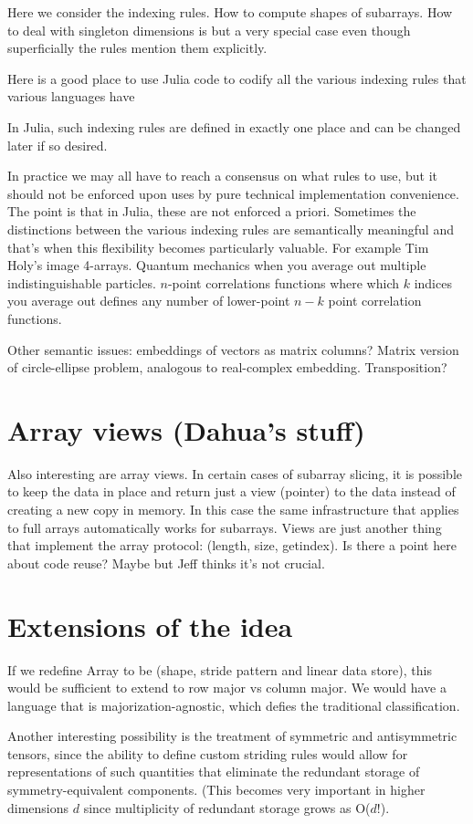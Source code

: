 \documentclass[english]{article}
\begin{document}
Here we consider the indexing rules. How to compute shapes of subarrays.
How to deal with singleton dimensions is but a very special case even
though superficially the rules mention them explicitly.

Here is a good place to use Julia code to codify all the various indexing
rules that various languages have

In Julia, such indexing rules are defined in exactly one place and
can be changed later if so desired.

In practice we may all have to reach a consensus on what rules to
use, but it should not be enforced upon uses by pure technical implementation
convenience. The point is that in Julia, these are not enforced a
priori. Sometimes the distinctions between the various indexing rules
are semantically meaningful and that's when this flexibility becomes
particularly valuable. For example Tim Holy's image 4-arrays. Quantum
mechanics when you average out multiple indistinguishable particles.
$n$-point correlations functions where which $k$ indices you average out defines
any number of lower-point $n-k$ point correlation functions.

Other semantic issues: embeddings of vectors as matrix columns? Matrix version
of circle-ellipse problem, analogous to real-complex embedding. Transposition?

\section{Array views (Dahua's stuff)}

Also interesting are array views. In certain cases of subarray slicing,
it is possible to keep the data in place and return just a view (pointer)
to the data instead of creating a new copy in memory. In this case
the same infrastructure that applies to full arrays automatically
works for subarrays. Views are just another thing that implement the
array protocol: (length, size, getindex). Is there a point here about
code reuse? Maybe but Jeff thinks it's not crucial.


\section{Extensions of the idea}

If we redefine Array to be (shape, stride pattern and linear data
store), this would be sufficient to extend to row major vs column
major. We would have a language that is majorization-agnostic, which
defies the traditional classification.

Another interesting possibility is the treatment of symmetric and antisymmetric
tensors, since the ability to define custom striding rules would allow for
representations of such quantities that eliminate the redundant storage of
symmetry-equivalent components. (This becomes very important in higher
dimensions $d$ since multiplicity of redundant storage grows as O($d!$).
\end{document}
